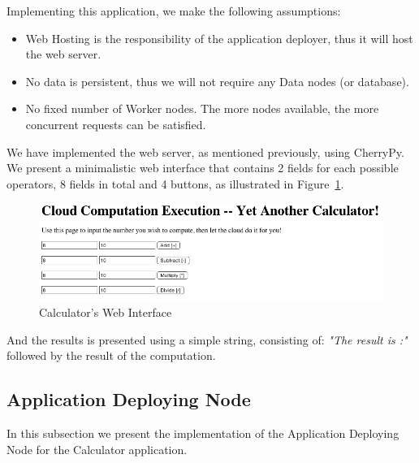 \documentclass[12pt, titlepage]{uo_temp}
\begin{document}
     Implementing this application, we make the following assumptions:
     \begin{itemize}
       \item Web Hosting is the responsibility of the application deployer, thus it will
         host the web server.
       \item No data is persistent, thus we will not require any Data nodes (or database).
       \item No fixed number of Worker nodes. The more nodes available, the more
         concurrent requests can be satisfied.
     \end{itemize}

     We have implemented the web server, as mentioned previously, using CherryPy. We present a
     minimalistic web interface that contains 2 fields for each possible operators, 8
     fields in total and 4 buttons, as illustrated in Figure~\ref{calc_home}.
     \begin{figure}[h!]
       \centering
       \includegraphics[width=125mm]{images/calc_home.png}
       \caption{Calculator's Web Interface}\label{calc_home}
     \end{figure}

     And the results is presented using a simple string, consisting of: \emph{"The result
       is :"} followed by the result of the computation.

     \subsection{Application Deploying Node}\label{impl_calc_appd}
     In this subsection we present the implementation of the Application Deploying Node
     for the Calculator application.
\end{document}
